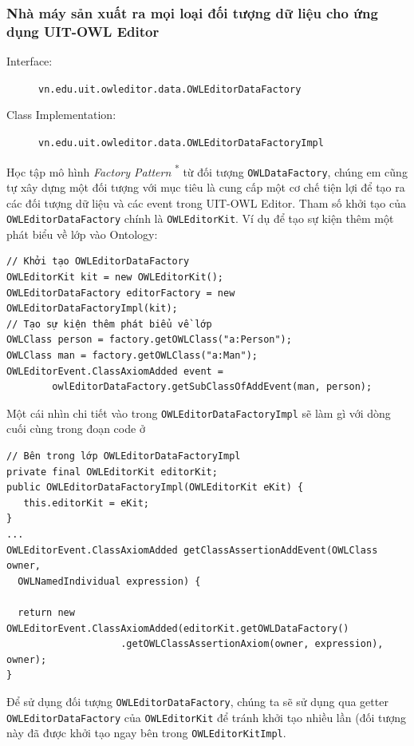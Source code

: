 \subsubsection{Nhà máy sản xuất ra mọi loại đối tượng dữ liệu cho ứng dụng UIT-OWL Editor}
{\let\thefootnote\relax{}
}
\begin{description}
\item[Interface:] \verb|vn.edu.uit.owleditor.data.OWLEditorDataFactory|
\item[Class Implementation:] \verb|vn.edu.uit.owleditor.data.OWLEditorDataFactoryImpl|
\end{description}
Học tập mô hình \textit{Factory Pattern} \textsuperscript{*} từ đối tượng \verb|OWLDataFactory|, chúng em cũng tự xây dựng một đối tượng với mục tiêu là cung cấp một cơ chế tiện lợi để tạo ra các đối tượng dữ liệu và các event trong UIT-OWL Editor. Tham số khởi tạo của \verb|OWLEditorDataFactory| chính là \verb|OWLEditorKit|. Ví dụ để tạo sự kiện thêm một phát biểu về lớp vào Ontology:
\begin{verbatim}
// Khởi tạo OWLEditorDataFactory
OWLEditorKit kit = new OWLEditorKit();
OWLEditorDataFactory editorFactory = new OWLEditorDataFactoryImpl(kit);
// Tạo sự kiện thêm phát biểu về lớp
OWLClass person = factory.getOWLClass("a:Person");
OWLClass man = factory.getOWLClass("a:Man");
OWLEditorEvent.ClassAxiomAdded event =
        owlEditorDataFactory.getSubClassOfAddEvent(man, person);
\end{verbatim}
Một cái nhìn chi tiết vào trong \verb|OWLEditorDataFactoryImpl| sẽ làm gì với dòng cuối cùng trong đoạn code ở 
\begin{verbatim}
// Bên trong lớp OWLEditorDataFactoryImpl
private final OWLEditorKit editorKit;
public OWLEditorDataFactoryImpl(OWLEditorKit eKit) {
   this.editorKit = eKit;
}
...
OWLEditorEvent.ClassAxiomAdded getClassAssertionAddEvent(OWLClass owner,
  OWLNamedIndividual expression) {

  return new OWLEditorEvent.ClassAxiomAdded(editorKit.getOWLDataFactory()
                    .getOWLClassAssertionAxiom(owner, expression), owner);
}
\end{verbatim}
Để sử dụng đối tượng \verb|OWLEditorDataFactory|, chúng ta sẽ sử dụng qua getter \verb|OWLEditorDataFactory| của \verb|OWLEditorKit| để tránh khởi tạo nhiều lần (đối tượng này đã được khởi tạo ngay bên trong \verb|OWLEditorKitImpl|.

